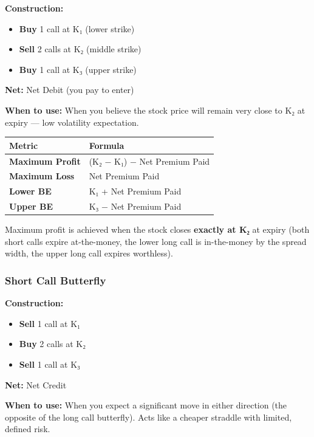 \documentclass[12pt,openany]{book}
\begin{document}
\textbf{Construction:}
\begin{itemize}[leftmargin=*]
    \item \textbf{Buy} 1 call at K₁ (lower strike)
    \item \textbf{Sell} 2 calls at K₂ (middle strike)
    \item \textbf{Buy} 1 call at K₃ (upper strike)
\end{itemize}

\textbf{Net:} Net Debit (you pay to enter)

\textbf{When to use:} When you believe the stock price will remain very close to K₂ at expiry — low volatility expectation.

\begin{center}
\scriptsize
\setlength{\tabcolsep}{3pt}
\begin{tabular}{|L{6.00cm}|L{6.00cm}|}
\hline
Metric & Formula \\
\hline
\textbf{Maximum Profit} & (K₂ − K₁) − Net Premium Paid \\
\hline
\textbf{Maximum Loss} & Net Premium Paid \\
\hline
\textbf{Lower BE} & K₁ + Net Premium Paid \\
\hline
\textbf{Upper BE} & K₃ − Net Premium Paid \\
\hline
\end{tabular}
\end{center}

Maximum profit is achieved when the stock closes \textbf{exactly at K₂} at expiry (both short calls expire at-the-money, the lower long call is in-the-money by the spread width, the upper long call expires worthless).



\subsubsection{Short Call Butterfly}

\textbf{Construction:}
\begin{itemize}[leftmargin=*]
    \item \textbf{Sell} 1 call at K₁
    \item \textbf{Buy} 2 calls at K₂
    \item \textbf{Sell} 1 call at K₃
\end{itemize}

\textbf{Net:} Net Credit

\textbf{When to use:} When you expect a significant move in either direction (the opposite of the long call butterfly). Acts like a cheaper straddle with limited, defined risk.
\end{document}
